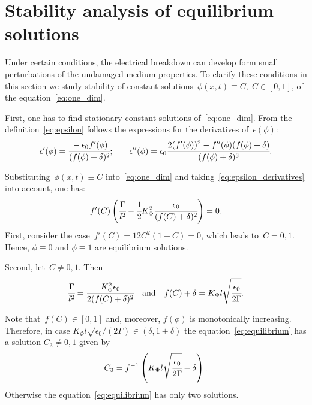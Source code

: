 
\section{Stability analysis of equilibrium solutions}
\label{sec:theoretical_analysis}

Under certain conditions, the electrical breakdown can develop
form small perturbations of the undamaged medium properties.
To clarify these conditions in this section we study
stability of constant solutions~$\phi(x, t) \equiv C, \; C \in [0, 1]$,
of the equation~\eqref{eq:one_dim}.

First, one has to find stationary constant solutions of~\eqref{eq:one_dim}.
From the definition~\eqref{eq:epsilon} follows the expressions for the derivatives
of~$\epsilon(\phi)$:
\begin{equation}
	\epsilon'(\phi) = \cfrac{-\epsilon_0 f'(\phi)}{(f(\phi) + \delta)^2} {\text{;}} \qquad \epsilon''(\phi) = \epsilon_0 \cfrac{2 (f'(\phi))^2 - f''(\phi)(f(\phi) + \delta)}{(f(\phi) + \delta)^3} {\text{.}}
	\label{eq:epsilon_derivatives}
\end{equation}

Substituting~$\phi(x, t) \equiv C$ into~\eqref{eq:one_dim} and
taking~\eqref{eq:epsilon_derivatives} into account, one has:
\begin{equation}
	f'(C) \left( \cfrac{\Gamma}{l^2} - \cfrac{1}{2} K_\Phi^2 \cfrac{\epsilon_0}{(f(C) + \delta)^2} \right) = 0 {\text{.}}
	\label{eq:equilibrium}
\end{equation}
First, consider the case~$f'(C) = 12C^2 (1 - C) = 0$,
which leads to~$C = 0,1$. Hence, $\phi \equiv 0$ and $\phi \equiv 1$ are
equilibrium solutions.

Second, let~$C \neq 0, 1$. Then
\[
\cfrac{\Gamma}{l^2} = \cfrac{K_\Phi^2 \epsilon_0}{2 (f(C) + \delta)^2}
\quad \text{and} \quad
f(C) + \delta = K_\Phi l \sqrt{\cfrac{\epsilon_0}{2 \Gamma}}.
\]

Note that~$f(C) \in [0, 1]$ and, moreover, $f(\phi)$ is monotonically
increasing. Therefore, in case $K_\Phi l \sqrt{\epsilon_0 / (2
  \Gamma)} \in (\delta, 1 + \delta)$ the
equation~\eqref{eq:equilibrium} has a solution $C_3\ne 0,1$ given by
\begin{equation}
	C_3 = f^{-1} \left( K_\Phi l \sqrt{\cfrac{\epsilon_0}{2 \Gamma}} - \delta \right) {\text{.}}
	\label{eq:equilibrium_third}
\end{equation}
Otherwise the equation~\eqref{eq:equilibrium} has only two solutions.

